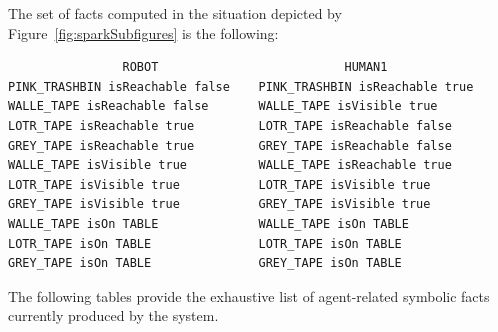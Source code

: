 \documentclass{svmult}
\begin{document}
The set of facts computed in the situation depicted by
Figure~\ref{fig:sparkSubfigures} is the following:
\begin{footnotesize}
\begin{verbatim}
                ROBOT                          HUMAN1
PINK_TRASHBIN isReachable false    PINK_TRASHBIN isReachable true 
WALLE_TAPE isReachable false       WALLE_TAPE isVisible true 
LOTR_TAPE isReachable true         LOTR_TAPE isReachable false 
GREY_TAPE isReachable true         GREY_TAPE isReachable false
WALLE_TAPE isVisible true          WALLE_TAPE isReachable true 
LOTR_TAPE isVisible true           LOTR_TAPE isVisible true 
GREY_TAPE isVisible true           GREY_TAPE isVisible true 
WALLE_TAPE isOn TABLE              WALLE_TAPE isOn TABLE 
LOTR_TAPE isOn TABLE               LOTR_TAPE isOn TABLE 
GREY_TAPE isOn TABLE               GREY_TAPE isOn TABLE 
\end{verbatim}
\end{footnotesize}


The following tables provide the exhaustive list of agent-related symbolic facts
currently produced by the system.
\end{document}
